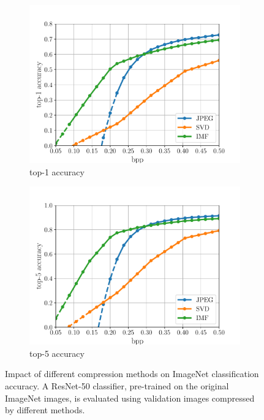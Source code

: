 \begin{figure}[t]
	\centering
	\begin{subfigure}{.45\textwidth}
		\centering
				\includegraphics[width=.95\textwidth]{figures/classification_performance_top1.pdf}
		\caption{top-1 accuracy}
		\label{fig: top1-vs-bpp imagenet}
	\end{subfigure}%
	\begin{subfigure}{.45\textwidth}
		\centering
				\includegraphics[width=.95\textwidth]{figures/classification_performance_top5.pdf}
		\caption{top-5 accuracy}
		\label{fig: top5-vs-bpp imagenet}
	\end{subfigure}
	\caption{Impact of different compression methods on ImageNet classification accuracy. 
    A ResNet-50 classifier, pre-trained on the original ImageNet images, is evaluated using validation images compressed by different methods.}
	\label{fig:imagenet_classification}
\end{figure}


